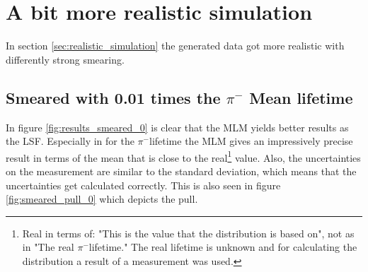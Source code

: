 \documentclass[11pt, a4paper, oneside]{book}
\newcommand{\pion}{$\pi^{-}$}
\begin{document}
\newpage
\section{A bit more realistic simulation} \label{sec:more_realisitic_results}

In section \ref{sec:realistic_simulation} the generated data got more realistic with differently strong smearing.

\subsection{Smeared with 0.01 times the \texorpdfstring{\pion}{pion} Mean lifetime}

In figure \ref{fig:results_smeared_0} is clear that the MLM yields better results as the LSF. Especially in for the \pion lifetime the MLM gives an impressively precise result in terms of the mean that is close to the real\footnote{Real in terms of: "This is the value that the distribution is based on", not as in "The real \pion lifetime." The real lifetime is unknown and for calculating the distribution a result of a measurement was used.} value. Also, the uncertainties on the measurement are similar to the standard deviation, which means that the uncertainties get calculated correctly. This is also seen in figure \ref{fig:smeared_pull_0} which depicts the pull.
\end{document}
